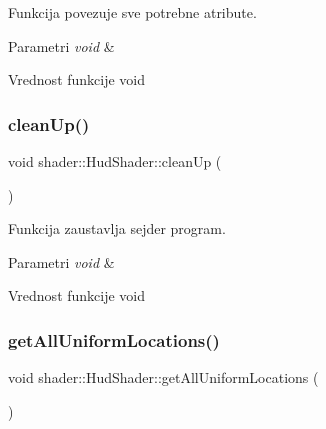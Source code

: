 Funkcija povezuje sve potrebne atribute. 


\begin{DoxyParams}{Parametri}
{\em void} & \\
\hline
\end{DoxyParams}
\begin{DoxyReturn}{Vrednost funkcije}
void 
\end{DoxyReturn}
\mbox{\label{classshader_1_1HudShader_a944a6532286b6071b53d97eee8980713}} 
\subsubsection{\texorpdfstring{clean\+Up()}{cleanUp()}}
{\footnotesize\ttfamily void shader\+::\+Hud\+Shader\+::clean\+Up (\begin{DoxyParamCaption}\item[{void}]{ }\end{DoxyParamCaption})}



Funkcija zaustavlja sejder program. 


\begin{DoxyParams}{Parametri}
{\em void} & \\
\hline
\end{DoxyParams}
\begin{DoxyReturn}{Vrednost funkcije}
void 
\end{DoxyReturn}
\mbox{\label{classshader_1_1HudShader_a881374d89ec7a37d5e73c8694ab42d09}} 
\subsubsection{\texorpdfstring{get\+All\+Uniform\+Locations()}{getAllUniformLocations()}}
{\footnotesize\ttfamily void shader\+::\+Hud\+Shader\+::get\+All\+Uniform\+Locations (\begin{DoxyParamCaption}\item[{void}]{ }\end{DoxyParamCaption})}




